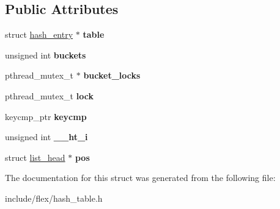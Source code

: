 \subsection*{Public Attributes}
\begin{DoxyCompactItemize}
\item 
struct \hyperlink{structhash__entry}{hash\+\_\+entry} $\ast$ {\bfseries table}\hypertarget{structhash__table_a04cd18d2fc0ace3527670ceca050492b}{}\label{structhash__table_a04cd18d2fc0ace3527670ceca050492b}

\item 
unsigned int {\bfseries buckets}\hypertarget{structhash__table_a4678419b52c36e8b949b17eb4843a420}{}\label{structhash__table_a4678419b52c36e8b949b17eb4843a420}

\item 
pthread\+\_\+mutex\+\_\+t $\ast$ {\bfseries bucket\+\_\+locks}\hypertarget{structhash__table_a4148c7a0d18b24d1c2961564dc0e7e7a}{}\label{structhash__table_a4148c7a0d18b24d1c2961564dc0e7e7a}

\item 
pthread\+\_\+mutex\+\_\+t {\bfseries lock}\hypertarget{structhash__table_af4cefababf047c699eca5f45f8d4284e}{}\label{structhash__table_af4cefababf047c699eca5f45f8d4284e}

\item 
keycmp\+\_\+ptr {\bfseries keycmp}\hypertarget{structhash__table_a9465a319f391f0a50a4a84362c40fe48}{}\label{structhash__table_a9465a319f391f0a50a4a84362c40fe48}

\item 
unsigned int {\bfseries \+\_\+\+\_\+ht\+\_\+i}\hypertarget{structhash__table_a77da69e21124ac1097627ae23ae72ef5}{}\label{structhash__table_a77da69e21124ac1097627ae23ae72ef5}

\item 
struct \hyperlink{structlist__head}{list\+\_\+head} $\ast$ {\bfseries pos}\hypertarget{structhash__table_af9bcc20e562a8a4f6dd37aaa543a3883}{}\label{structhash__table_af9bcc20e562a8a4f6dd37aaa543a3883}

\end{DoxyCompactItemize}


The documentation for this struct was generated from the following file\+:\begin{DoxyCompactItemize}
\item 
include/flex/hash\+\_\+table.\+h\end{DoxyCompactItemize}

